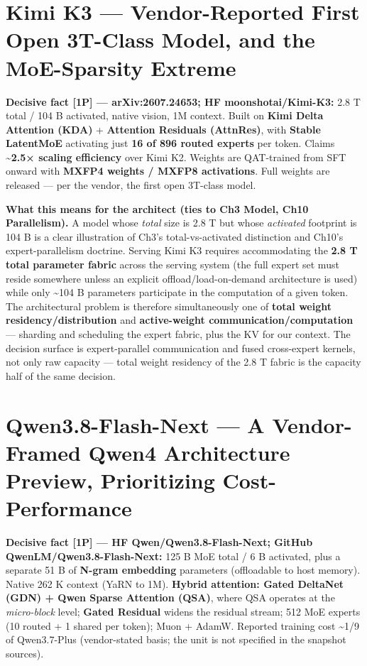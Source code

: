 \section{Kimi K3 --- Vendor-Reported First Open 3T-Class Model, and the
MoE-Sparsity
Extreme}\label{kimi-k3-vendor-reported-first-open-3t-class-model-and-the-moe-sparsity-extreme}

\textbf{Decisive fact \mbox{{[}1P{]}} --- arXiv:2607.24653; HF
moonshotai/Kimi-K3:} 2.8 T total / 104 B activated, native vision, 1M
context. Built on \textbf{Kimi Delta Attention (KDA)} +
\textbf{Attention Residuals (AttnRes)}, with \textbf{Stable LatentMoE}
activating just \textbf{16 of 896 routed experts} per token. Claims
\textasciitilde{}\textbf{2.5× scaling efficiency} over Kimi K2. Weights
are QAT-trained from SFT onward with \textbf{MXFP4 weights / MXFP8
activations}. Full weights are released --- per the vendor, the first
open 3T-class model.

\textbf{What this means for the architect (ties to Ch3 Model, Ch10
Parallelism).} A model whose \emph{total} size is 2.8 T but whose
\emph{activated} footprint is 104 B is a clear illustration of Ch3's
total-vs-activated distinction and Ch10's expert-parallelism doctrine.
Serving Kimi K3 requires accommodating the \textbf{2.8 T total parameter
fabric} across the serving system (the full expert set must reside
somewhere unless an explicit offload/load-on-demand architecture is
used) while only \textasciitilde104 B parameters participate in the
computation of a given token. The architectural problem is therefore
simultaneously one of \textbf{total weight residency/distribution} and
\textbf{active-weight communication/computation} --- sharding and
scheduling the expert fabric, plus the KV for our context. The decision
surface is expert-parallel communication and fused cross-expert kernels,
not only raw capacity --- total weight residency of the 2.8 T fabric is
the capacity half of the same decision.

\section{Qwen3.8-Flash-Next --- A Vendor-Framed Qwen4 Architecture
Preview, Prioritizing
Cost-Performance}\label{qwen3.8-flash-next-a-vendor-framed-qwen4-architecture-preview-prioritizing-cost-performance}

\textbf{Decisive fact \mbox{{[}1P{]}} --- HF Qwen/Qwen3.8-Flash-Next; GitHub
QwenLM/Qwen3.8-Flash-Next:} 125 B MoE total / 6 B activated, plus a
separate 51 B of \textbf{N-gram embedding} parameters (offloadable to
host memory). Native 262 K context (YaRN to 1M). \textbf{Hybrid
attention: Gated DeltaNet (GDN) + Qwen Sparse Attention (QSA)}, where
QSA operates at the \emph{micro-block} level; \textbf{Gated Residual}
widens the residual stream; 512 MoE experts (10 routed + 1 shared per
token); Muon + AdamW. Reported training cost \textasciitilde1/9 of
Qwen3.7-Plus (vendor-stated basis; the unit is not specified in the
snapshot sources).


